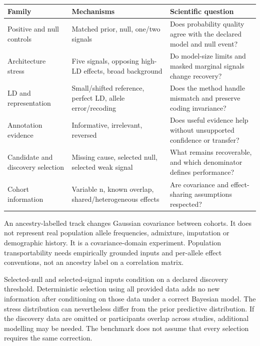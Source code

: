 \documentclass[
  british,
  10pt,
]{article}
\newcounter{none} %
\begin{document}
{\def\LTcaptype{none} %
\begin{longtable}[]{@{}
  >{\raggedright\arraybackslash}p{}
  >{\raggedright\arraybackslash}p{}
  >{\raggedright\arraybackslash}p{}@{}}
\toprule\noalign{}
\begin{minipage}[b]{\linewidth}\raggedright
Family
\end{minipage} & \begin{minipage}[b]{\linewidth}\raggedright
Mechanisms
\end{minipage} & \begin{minipage}[b]{\linewidth}\raggedright
Scientific question
\end{minipage} \\
\midrule\noalign{}
\endhead
\bottomrule\noalign{}
\endlastfoot
Positive and null controls & Matched prior, null, one/two signals & Does
probability quality agree with the declared model and null event? \\
Architecture stress & Five signals, opposing high-LD effects, broad
background & Do model-size limits and masked marginal signals change
recovery? \\
LD and representation & Small/shifted reference, perfect LD, allele
error/recoding & Does the method handle mismatch and preserve coding
invariance? \\
Annotation evidence & Informative, irrelevant, reversed & Does useful
evidence help without unsupported confidence or transfer? \\
Candidate and discovery selection & Missing cause, selected null,
selected weak signal & What remains recoverable, and which denominator
defines performance? \\
Cohort information & Variable n, known overlap, shared/heterogeneous
effects & Are covariance and effect-sharing assumptions respected? \\
\end{longtable}
}

An ancestry-labelled track changes Gaussian covariance between cohorts.
It does not represent real population allele frequencies, admixture,
imputation or demographic history. It is a covariance-domain experiment.
Population transportability needs empirically grounded inputs and
per-allele effect conventions, not an ancestry label on a correlation
matrix.

Selected-null and selected-signal inputs condition on a declared
discovery threshold. Deterministic selection using all provided data
adds no new information after conditioning on those data under a correct
Bayesian model. The stress distribution can nevertheless differ from the
prior predictive distribution. If the discovery data are omitted or
participants overlap across studies, additional modelling may be needed.
The benchmark does not assume that every selection requires the same
correction.
\end{document}
